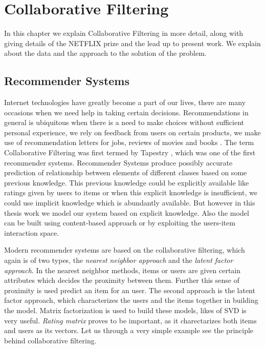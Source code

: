 \chapter{Collaborative Filtering}


\textsf{ In this chapter we explain Collaborative Filtering in more detail,
along with giving details of the NETFLIX prize and the lead up to present work.
We explain about the data and the approach to the solution of the problem.}


\section{Recommender Systems}
Internet technologies have greatly become a part of our lives, there are many
occasions when we need help in taking certain decisions. Recommendations in
general is ubiquitous when there is a need to make choices without sufficient
personal experience, we rely on feedback from users on certain products, we make
use of recommendation letters for jobs, reviews of movies and books
\cite{Resnick:1997:RS:245108.245121}. 
  The term Collaborative Filtering was first termed by Tapestry
\cite{Goldberg:1992:UCF:138859.138867}, which was one of the first recommender
systems. Recommender
Systems produce possibly accurate prediction of relationship between elements of
different classes based on some previous knowledge. This previous knowledge
could be explicitly available like ratings given by users to items or when this
explicit knowledge is insufficient, we could use implicit knowledge which is
abundantly available. But however in this thesis work we model our system based
on explicit knowledge. Also the model can be built using content-based approach
or by exploiting the users-item interaction space. 

Modern recommender systems are based on the collaborative filtering, which again
is of two types, the \textit{nearest neighbor approach} and the \textit{latent
factor approach}. In the nearest neighbor methods, items or users are given
certain
attributes which decides the proximity between them. Further this sense of
proximity is used predict an item for an user. The second approach is
the latent factor approach, which characterizes the users and the items together
in building the model. Matrix factorization is used to build these models, likes
of SVD is very useful. \emph{Rating matrix} proves to be important, as it
charectarizes both items and users as its vectors. 
\clearpage
Let us through a very simple example see the principle behind collaborative
filtering.

